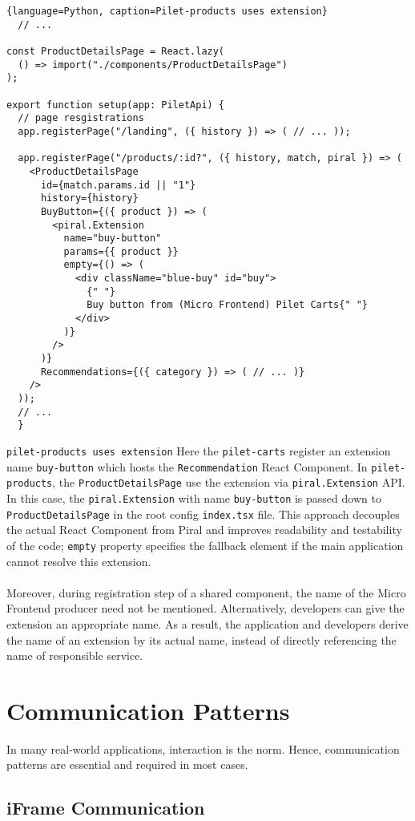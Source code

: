 \documentclass[a4paper]{book}
\begin{document}
\begin{lstlisting}{language=Python, caption=Pilet-products uses extension}
  // ...

const ProductDetailsPage = React.lazy(
  () => import("./components/ProductDetailsPage")
);

export function setup(app: PiletApi) {
  // page resgistrations
  app.registerPage("/landing", ({ history }) => ( // ... ));

  app.registerPage("/products/:id?", ({ history, match, piral }) => (
    <ProductDetailsPage
      id={match.params.id || "1"}
      history={history}
      BuyButton={({ product }) => (
        <piral.Extension
          name="buy-button"
          params={{ product }}
          empty={() => (
            <div className="blue-buy" id="buy">
              {" "}
              Buy button from (Micro Frontend) Pilet Carts{" "}
            </div>
          )}
        />
      )}
      Recommendations={({ category }) => ( // ... )}
    />
  ));
  // ...
  }
\end{lstlisting}
\verb|pilet-products uses extension|
Here the \verb|pilet-carts| register an extension name \verb|buy-button| which hosts the \verb|Recommendation| React Component. In \verb|pilet-products|, the \verb|ProductDetailsPage| use the extension via \verb|piral.Extension| API. In this case, the \verb|piral.Extension| with name \verb|buy-button| is passed down to \verb|ProductDetailsPage| in the root config \verb|index.tsx| file. This approach decouples the actual React Component from Piral and improves readability and testability of the code; \verb|empty| property specifies the fallback element if the main application cannot resolve this extension.
\\ \\ 
Moreover, during registration step of a shared component, the name of the Micro Frontend producer need not be mentioned. Alternatively, developers can give the extension an appropriate name. As a result, the application and developers derive the name of an extension by its actual name, instead of directly referencing the name of responsible service.

\section{Communication Patterns}
In many real-world applications, interaction is the norm. Hence, communication patterns are essential and required in most cases.
\subsection{iFrame Communication}
\end{document}
